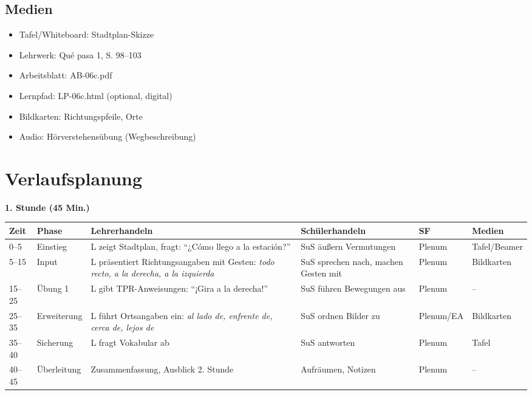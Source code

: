 \documentclass[11pt,a4paper]{article}
\newcommand{\lehrwerk}{Qué pasa 1}
\newcommand{\lehrwerkseite}{S. 98--103}
\begin{document}
\subsection{Medien}
\begin{itemize}
    \item Tafel/Whiteboard: Stadtplan-Skizze
    \item Lehrwerk: \lehrwerk, \lehrwerkseite
    \item Arbeitsblatt: AB-06c.pdf
    \item Lernpfad: LP-06c.html (optional, digital)
    \item Bildkarten: Richtungspfeile, Orte
    \item Audio: Hörverstehensübung (Wegbeschreibung)
\end{itemize}

\section{Verlaufsplanung}

\textbf{1. Stunde (45 Min.)}

\begin{longtable}{|p{1cm}|p{1.5cm}|p{4cm}|p{3cm}|p{2cm}|p{2cm}|}
\hline
\textbf{Zeit} & \textbf{Phase} & \textbf{Lehrerhandeln} & \textbf{Schülerhandeln} & \textbf{SF} & \textbf{Medien} \\
\hline
\endhead

0--5 & Einstieg & L zeigt Stadtplan, fragt: ``¿Cómo llego a la estación?'' & SuS äußern Vermutungen & Plenum & Tafel/Beamer \\
\hline

5--15 & Input & L präsentiert Richtungsangaben mit Gesten: \textit{todo recto, a la derecha, a la izquierda} & SuS sprechen nach, machen Gesten mit & Plenum & Bildkarten \\
\hline

15--25 & Übung 1 & L gibt TPR-Anweisungen: ``¡Gira a la derecha!'' & SuS führen Bewegungen aus & Plenum & -- \\
\hline

25--35 & Erweiterung & L führt Ortsangaben ein: \textit{al lado de, enfrente de, cerca de, lejos de} & SuS ordnen Bilder zu & Plenum/EA & Bildkarten \\
\hline

35--40 & Sicherung & L fragt Vokabular ab & SuS antworten & Plenum & Tafel \\
\hline

40--45 & Überleitung & Zusammenfassung, Ausblick 2. Stunde & Aufräumen, Notizen & Plenum & -- \\
\hline
\end{longtable}
\end{document}
